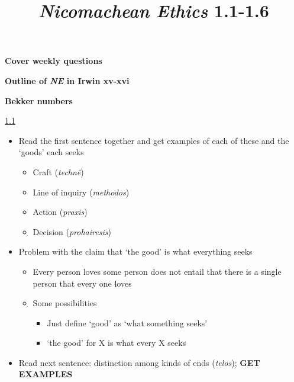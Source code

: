 \documentclass[11pt]{article}
\title{\emph{Nicomachean Ethics} 1.1-1.6}
\author{}
\date{}
\begin{document}
\maketitle

\noindent\textbf{Cover weekly questions}
\vspace*{2mm}

\noindent\textbf{Outline of \emph{NE} in Irwin xv-xvi}
\vspace*{2mm}

\noindent\textbf{Bekker numbers}
\vspace*{4mm}

\noindent\underline{1.1}

\begin{itemize}

\item{Read the first sentence together and get examples of each of these and the `goods' each seeks}

\begin{itemize}

\item{Craft (\emph{techn\^{e}})}

\item{Line of inquiry (\emph{methodos})}

\item{Action (\emph{praxis})}

\item{Decision (\emph{prohairesis})}

\end{itemize}

\item{Problem with the claim that `the good' is what everything seeks}\begin{itemize}\item{Every person loves some person does not entail that there is a single person that every one loves}\item{Some possibilities}\begin{itemize}\item{Just define `good' as `what something seeks'}\item{`the good' for X is what every X seeks}\end{itemize}\end{itemize}

\item{Read next sentence: distinction among kinds of ends (\emph{telos}); \textbf{GET EXAMPLES}}


\end{itemize}
\end{document}
